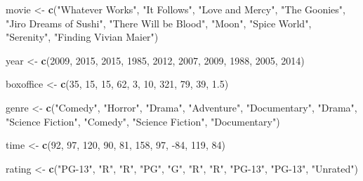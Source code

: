 \documentclass[]{book}
\newenvironment{Shaded}{\begin{snugshade}}{\end{snugshade}}
\newcommand{\KeywordTok}[1]{\textcolor[rgb]{0.13,0.29,0.53}{\textbf{{#1}}}}
\newcommand{\DecValTok}[1]{\textcolor[rgb]{0.00,0.00,0.81}{{#1}}}
\newcommand{\FloatTok}[1]{\textcolor[rgb]{0.00,0.00,0.81}{{#1}}}
\newcommand{\StringTok}[1]{\textcolor[rgb]{0.31,0.60,0.02}{{#1}}}
\newcommand{\NormalTok}[1]{{#1}}
\theoremstyle{definition}
\theoremstyle{definition}
\theoremstyle{remark}
\begin{document}
\begin{Shaded}
\begin{Highlighting}[]
\NormalTok{movie <-}\StringTok{ }\KeywordTok{c}\NormalTok{(}\StringTok{"Whatever Works"}\NormalTok{, }\StringTok{"It Follows"}\NormalTok{, }\StringTok{"Love and Mercy"}\NormalTok{, }
             \StringTok{"The Goonies"}\NormalTok{, }\StringTok{"Jiro Dreams of Sushi"}\NormalTok{,}
             \StringTok{"There Will be Blood"}\NormalTok{, }\StringTok{"Moon"}\NormalTok{, }
             \StringTok{"Spice World"}\NormalTok{, }\StringTok{"Serenity"}\NormalTok{, }\StringTok{"Finding Vivian Maier"}\NormalTok{)}

\NormalTok{year <-}\StringTok{ }\KeywordTok{c}\NormalTok{(}\DecValTok{2009}\NormalTok{, }\DecValTok{2015}\NormalTok{, }\DecValTok{2015}\NormalTok{, }\DecValTok{1985}\NormalTok{, }\DecValTok{2012}\NormalTok{, }\DecValTok{2007}\NormalTok{, }\DecValTok{2009}\NormalTok{, }\DecValTok{1988}\NormalTok{, }\DecValTok{2005}\NormalTok{, }\DecValTok{2014}\NormalTok{)}

\NormalTok{boxoffice <-}\StringTok{ }\KeywordTok{c}\NormalTok{(}\DecValTok{35}\NormalTok{, }\DecValTok{15}\NormalTok{, }\DecValTok{15}\NormalTok{, }\DecValTok{62}\NormalTok{, }\DecValTok{3}\NormalTok{, }\DecValTok{10}\NormalTok{, }\DecValTok{321}\NormalTok{, }\DecValTok{79}\NormalTok{, }\DecValTok{39}\NormalTok{, }\FloatTok{1.5}\NormalTok{)}

\NormalTok{genre <-}\StringTok{ }\KeywordTok{c}\NormalTok{(}\StringTok{"Comedy"}\NormalTok{, }\StringTok{"Horror"}\NormalTok{, }\StringTok{"Drama"}\NormalTok{, }\StringTok{"Adventure"}\NormalTok{, }\StringTok{"Documentary"}\NormalTok{, }
           \StringTok{"Drama"}\NormalTok{, }\StringTok{"Science Fiction"}\NormalTok{, }\StringTok{"Comedy"}\NormalTok{, }\StringTok{"Science Fiction"}\NormalTok{, }
           \StringTok{"Documentary"}\NormalTok{)}

\NormalTok{time <-}\StringTok{ }\KeywordTok{c}\NormalTok{(}\DecValTok{92}\NormalTok{, }\DecValTok{97}\NormalTok{, }\DecValTok{120}\NormalTok{, }\DecValTok{90}\NormalTok{, }\DecValTok{81}\NormalTok{, }\DecValTok{158}\NormalTok{, }\DecValTok{97}\NormalTok{, -}\DecValTok{84}\NormalTok{, }\DecValTok{119}\NormalTok{, }\DecValTok{84}\NormalTok{)}

\NormalTok{rating <-}\StringTok{ }\KeywordTok{c}\NormalTok{(}\StringTok{"PG-13"}\NormalTok{, }\StringTok{"R"}\NormalTok{, }\StringTok{"R"}\NormalTok{, }\StringTok{"PG"}\NormalTok{, }\StringTok{"G"}\NormalTok{, }\StringTok{"R"}\NormalTok{, }\StringTok{"R"}\NormalTok{, }
            \StringTok{"PG-13"}\NormalTok{, }\StringTok{"PG-13"}\NormalTok{, }\StringTok{"Unrated"}\NormalTok{)}
\end{Highlighting}
\end{Shaded}
\end{document}
